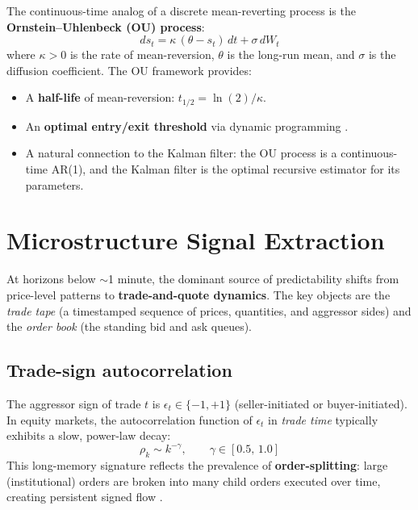 \documentclass[11pt,a4paper]{article}
\begin{document}
The continuous-time analog of a discrete mean-reverting process is the
\textbf{Ornstein--Uhlenbeck (OU) process}:
\begin{equation}
  ds_t = \kappa\,(\theta - s_t)\,dt + \sigma\,dW_t
\end{equation}
where $\kappa > 0$ is the rate of mean-reversion, $\theta$ is the
long-run mean, and $\sigma$ is the diffusion coefficient. The OU
framework provides:
\begin{itemize}[leftmargin=1.5em]
  \item A \textbf{half-life} of mean-reversion: $t_{1/2} = \ln(2)/\kappa$.
  \item An \textbf{optimal entry/exit threshold} via dynamic programming
        \citep{leung2015optimal}.
  \item A natural connection to the Kalman filter: the OU process is a
        continuous-time AR(1), and the Kalman filter is the optimal
        recursive estimator for its parameters.
\end{itemize}

\section{Microstructure Signal Extraction}

At horizons below $\sim$1 minute, the dominant source of predictability
shifts from price-level patterns to \textbf{trade-and-quote dynamics}.
The key objects are the \emph{trade tape} (a timestamped sequence of
prices, quantities, and aggressor sides) and the \emph{order book}
(the standing bid and ask queues).

\subsection{Trade-sign autocorrelation}
\label{sec:sign-acf}

The aggressor sign of trade $t$ is $\epsilon_t \in \{-1, +1\}$
(seller-initiated or buyer-initiated). In equity markets, the
autocorrelation function of $\epsilon_t$ in \emph{trade time}
typically exhibits a slow, power-law decay:
\begin{equation}
  \rho_k \sim k^{-\gamma}, \qquad \gamma \in [0.5,\, 1.0]
  \label{eq:sign-acf}
\end{equation}
This long-memory signature reflects the prevalence of
\textbf{order-splitting}: large (institutional) orders are broken into
many child orders executed over time, creating persistent signed flow
\citep{lillo2004long, bouchaud2009markets}.
\end{document}
